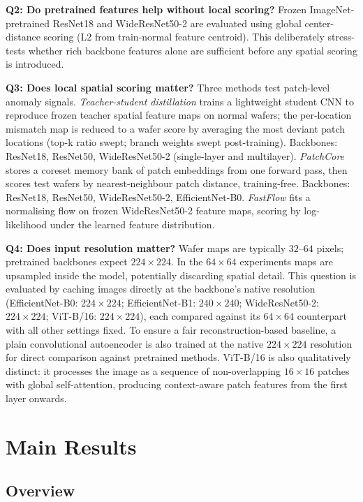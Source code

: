 \documentclass[11pt]{article}
\begin{document}
\textbf{Q2: Do pretrained features help without local scoring?} Frozen
ImageNet-pretrained ResNet18 and WideResNet50-2 are evaluated using global
center-distance scoring (L2 from train-normal feature centroid). This
deliberately stress-tests whether rich backbone features alone are sufficient
before any spatial scoring is introduced.

\textbf{Q3: Does local spatial scoring matter?} Three methods test patch-level
anomaly signals. \emph{Teacher-student distillation} trains a lightweight student
CNN to reproduce frozen teacher spatial feature maps on normal wafers; the
per-location mismatch map is reduced to a wafer score by averaging the most
deviant patch locations (top-k ratio swept; branch weights swept post-training).
Backbones: ResNet18, ResNet50, WideResNet50-2 (single-layer and multilayer).
\emph{PatchCore} stores a coreset memory bank of patch embeddings from one
forward pass, then scores test wafers by nearest-neighbour patch distance,
training-free. Backbones: ResNet18, ResNet50, WideResNet50-2, EfficientNet-B0.
\emph{FastFlow} fits a normalising flow on frozen WideResNet50-2 feature maps,
scoring by log-likelihood under the learned feature distribution.

\textbf{Q4: Does input resolution matter?} Wafer maps are typically
$32$--$64$ pixels; pretrained backbones expect $224\!\times\!224$. In the
$64\!\times\!64$ experiments maps are upsampled inside the model, potentially
discarding spatial detail. This question is evaluated by caching images directly
at the backbone's native resolution (EfficientNet-B0: $224\!\times\!224$;
EfficientNet-B1: $240\!\times\!240$; WideResNet50-2: $224\!\times\!224$;
ViT-B/16: $224\!\times\!224$), each compared against its $64\!\times\!64$
counterpart with all other settings fixed. To ensure a fair reconstruction-based
baseline, a plain convolutional autoencoder is also trained at the native
$224\!\times\!224$ resolution for direct comparison against pretrained methods.
ViT-B/16 is also qualitatively distinct: it processes the image as a sequence of
non-overlapping $16\!\times\!16$ patches with global self-attention, producing
context-aware patch features from the first layer onwards.

\section{Main Results}

\subsection{Overview}
\end{document}
